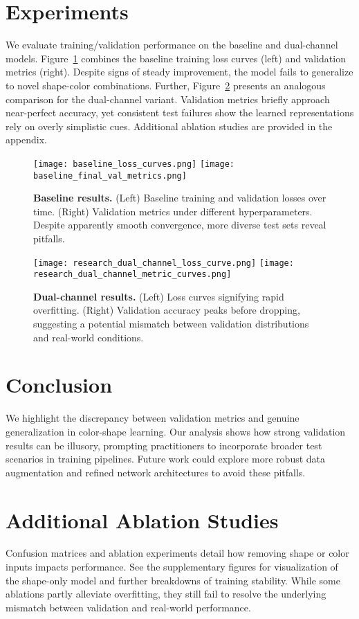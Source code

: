\documentclass{article}
\begin{document}
\section{Experiments}
We evaluate training/validation performance on the baseline and dual-channel models. Figure~\ref{fig:baseline_fig} combines the baseline training loss curves (left) and validation metrics (right). Despite signs of steady improvement, the model fails to generalize to novel shape-color combinations. Further, Figure~\ref{fig:dualchannel} presents an analogous comparison for the dual-channel variant. Validation metrics briefly approach near-perfect accuracy, yet consistent test failures show the learned representations rely on overly simplistic cues. Additional ablation studies are provided in the appendix.

\begin{figure}[t]
\centering
\texttt{[image: baseline\_loss\_curves.png]}
\hfill
\texttt{[image: baseline\_final\_val\_metrics.png]}
\caption{\textbf{Baseline results.} (Left) Baseline training and validation losses over time. (Right) Validation metrics under different hyperparameters. Despite apparently smooth convergence, more diverse test sets reveal pitfalls.}
\label{fig:baseline_fig}
\end{figure}

\begin{figure}[t]
\centering
\texttt{[image: research\_dual\_channel\_loss\_curve.png]}
\hfill
\texttt{[image: research\_dual\_channel\_metric\_curves.png]}
\caption{\textbf{Dual-channel results.} (Left) Loss curves signifying rapid overfitting. (Right) Validation accuracy peaks before dropping, suggesting a potential mismatch between validation distributions and real-world conditions.}
\label{fig:dualchannel}
\end{figure}

\section{Conclusion}
We highlight the discrepancy between validation metrics and genuine generalization in color-shape learning. Our analysis shows how strong validation results can be illusory, prompting practitioners to incorporate broader test scenarios in training pipelines. Future work could explore more robust data augmentation and refined network architectures to avoid these pitfalls.

\appendix
\section{Additional Ablation Studies}
Confusion matrices and ablation experiments detail how removing shape or color inputs impacts performance. See the supplementary figures for visualization of the shape-only model and further breakdowns of training stability. While some ablations partly alleviate overfitting, they still fail to resolve the underlying mismatch between validation and real-world performance.



\end{document}
